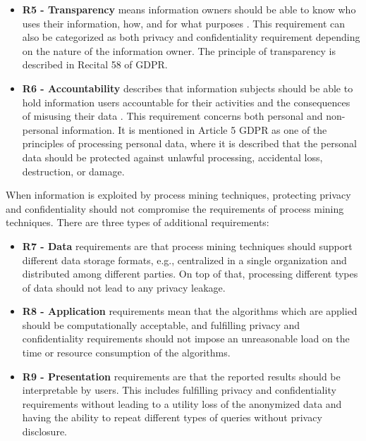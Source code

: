 \documentclass[manuscript]{acmart}
\begin{document}
\begin{itemize}
   \item \textbf{R5 - Transparency} means information owners should be able to know who uses their information, how, and for what purposes \cite{teminology_2006_dritsas}. This requirement can also be categorized as both privacy and confidentiality requirement depending on the nature of the information owner. The principle of transparency is described in Recital 58 of GDPR.
   \item \textbf{R6 - Accountability} describes that information subjects should be able to hold information users accountable for their activities and the consequences of misusing their data \cite{teminology_2006_dritsas}. This requirement concerns both personal and non-personal information. It is mentioned in Article 5 GDPR as one of the principles of processing personal data, where it is described that the personal data should be protected against unlawful processing, accidental loss, destruction, or damage.
\end{itemize}

When information is exploited by process mining techniques, protecting privacy and confidentiality should not compromise the requirements of process mining techniques. There are three types of additional requirements:%

\begin{itemize}
    \item \textbf{R7 - Data} requirements are that process mining techniques should support different data storage formats, e.g., centralized in a single organization and distributed among different parties. On top of that, processing different types of data should not lead to any privacy leakage.
    
    \item \textbf{R8 - Application} requirements mean that the algorithms which are applied should be computationally acceptable, and fulfilling privacy and confidentiality requirements should not impose an unreasonable load on the time or resource consumption of the algorithms.
    
    \item \textbf{R9 - Presentation} requirements are that the reported results should be interpretable by users. This includes fulfilling privacy and confidentiality requirements without leading to a utility loss of the anonymized data and having the ability to repeat different types of queries without privacy disclosure.
\end{itemize}
\end{document}
